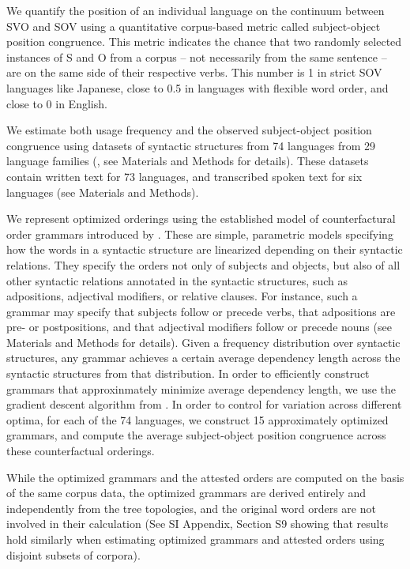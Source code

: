 \documentclass[9pt,twocolumn,twoside,lineno]{pnas-new}
\begin{document}
We quantify the position of an individual language on the continuum between SVO and SOV using a quantitative corpus-based metric called subject-object position congruence.
This metric indicates the chance that two randomly selected instances of S and O from a corpus -- not necessarily from the same sentence -- are on the same side of their respective verbs. This number is 1 in strict SOV languages like Japanese, close to 0.5 in languages with flexible word order, and close to 0 in English.


We estimate both usage frequency and the observed subject-object position congruence using datasets of syntactic structures from 74 languages from 29 language families (\citep{zeman2020universal}, see Materials and Methods for details).
These datasets contain written text for 73 languages, and transcribed spoken text for six languages (see Materials and Methods).

We represent optimized orderings using the  established model of counterfactural order grammars introduced by \cite{gildea-optimizing-2007}.
These are simple, parametric models specifying how the words in a syntactic structure are linearized depending on their syntactic relations.
They specify the orders not only of subjects and objects, but also of all other syntactic relations annotated in the syntactic structures, such as adpositions, adjectival modifiers, or relative clauses.
For instance, such a grammar may specify that subjects follow or precede verbs, that adpositions are pre- or postpositions, and that adjectival modifiers follow or precede nouns (see Materials and Methods for details).
Given a frequency distribution over syntactic structures, any grammar achieves a certain average dependency length across the syntactic structures from that distribution.
In order to efficiently construct grammars that approxinmately minimize average dependency length, we use the gradient descent algorithm from \cite{hahn2020universals}.
In order to control for variation across different optima, for each of the 74 languages, we construct 15 approximately optimized grammars, and compute the average subject-object position congruence across these counterfactual orderings.




While the optimized grammars and the attested orders are computed on the basis of the same corpus data, the optimized grammars are derived entirely and independently from the tree topologies, and the original word orders are not involved in their calculation (See SI Appendix, Section S9 showing that results hold similarly when estimating optimized grammars and attested orders using disjoint subsets of corpora).
\end{document}
